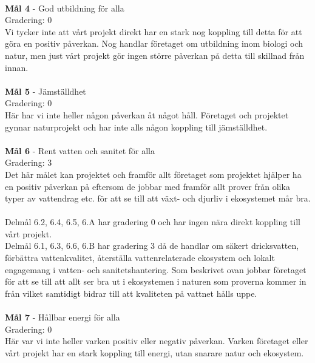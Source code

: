 \\
\textbf{Mål 4}
 - God utbildning för alla
\\
Gradering: 0
\\
Vi tycker inte att vårt projekt direkt har en stark nog koppling till detta för att göra en positiv påverkan. Nog handlar företaget om utbildning inom biologi och natur, men just vårt projekt gör ingen större påverkan på detta till skillnad från innan. 
\\
\\
\textbf{Mål 5}
 - Jämställdhet
\\
Gradering: 0
\\
Här har vi inte heller någon påverkan åt något håll. Företaget och projektet gynnar naturprojekt och har inte alls någon koppling till jämställdhet.
\\
\\
\textbf{Mål 6}
 - Rent vatten och sanitet för alla
\\
Gradering: 3
\\
Det här målet kan projektet och framför allt företaget som projektet hjälper ha en positiv påverkan på eftersom de jobbar med framför allt prover från olika typer av vattendrag etc. för att se till att växt- och djurliv i ekosystemet mår bra.
\\
\\
Delmål 6.2, 6.4, 6.5, 6.A har gradering 0 och har ingen nära direkt koppling till vårt projekt.
\\
Delmål 6.1, 6.3, 6.6, 6.B har gradering 3 då de handlar om säkert dricksvatten, förbättra vattenkvalitet, återställa vattenrelaterade ekosystem och lokalt engagemang i vatten- och sanitetshantering. Som beskrivet ovan jobbar företaget för att se till att allt ser bra ut i ekosystemen i naturen som proverna kommer in från vilket samtidigt bidrar till att kvaliteten på vattnet hålls uppe. 
\\
\\
\textbf{Mål 7}
 - Hållbar energi för alla
\\
Gradering: 0
\\
Här var vi inte heller varken positiv eller negativ påverkan. Varken företaget eller vårt projekt har en stark koppling till energi, utan snarare natur och ekosystem. 
\\
\\